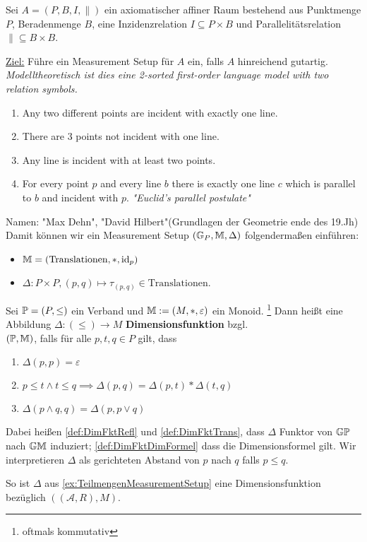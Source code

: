 \begin{beispiel}
    Sei $A = (P,B,I, \parallel)$ ein axiomatischer affiner Raum bestehend aus Punktmenge $P$, Beradenmenge $B$, eine
    Inzidenzrelation $I \subseteq P\times B$ und Parallelitätsrelation ${}\parallel{} \subseteq B \times B$.

    \underline{Ziel:} Führe ein Measurement Setup für $A$ ein, falls $A$ hinreichend gutartig.
    \textit{Modelltheoretisch ist dies eine 2-sorted first-order language model with two relation symbols.}

    \begin{enumerate}[label=(Axiom \arabic{*})]
        \item Any two different points are incident with exactly one line.
        \item There are 3 points not incident with one line.
        \item Any line is incident with at least two points.
        \item For every point $p$ and every line $b$ there is exactly one line $c$ which is parallel to $b$ and incident with $p$.
        \textit{"Euclid's parallel postulate"}
    \end{enumerate}

    Namen: "Max Dehn", "David Hilbert"(Grundlagen der Geometrie ende des 19.Jh)\nl
    Damit können wir ein Measurement Setup $(\G_P, \M, \Delta)$ folgendermaßen einführen:
    \begin{itemize}
        \item $\M = (\text{Translationen}, \ast, \id_p)$
        \item $\Delta: P\times P, (p,q) \mapsto \tau_{(p,q)} \in \text{Translationen}$.
    \end{itemize}
\end{beispiel}

\begin{definition}[Dimensionsfunktion]
    Sei $\P = (P, \leq)$ ein Verband und $\M := (M, *, \varepsilon)$ ein Monoid.%
    \footnote{oftmals kommutativ}
    Dann heißt eine Abbildung $\Delta\colon (\leq) \to M$ \textbf{Dimensionsfunktion} bzgl.\\$(\P, \M)$, falls für alle $p, t, q\in P$ gilt, dass
    \begin{enumerate}[label=(\arabic*)]
        \item $\Delta(p, p) = \varepsilon$
            \label{def:DimFktRefl}
        \item $p\leq t \land t\leq q \implies \Delta(p, q) = \Delta(p, t) * \Delta(t, q)$
            \label{def:DimFktTrans}
        \item $\Delta(p\land q, q) = \Delta(p, p\lor q)$
            \label{def:DimFktDimFormel}
    \end{enumerate}
    Dabei heißen \ref{def:DimFktRefl} und \ref{def:DimFktTrans}, dass $\Delta$ Funktor von $\G\P$ nach $\G\M$ induziert;
    \ref{def:DimFktDimFormel} dass die Dimensionsformel gilt.
    Wir interpretieren $\Delta$ als gerichteten Abstand von $p$ nach $q$ falls $p\leq q$.
\end{definition}
So ist $\Delta$ aus \autoref{ex:TeilmengenMeasurementSetup} eine Dimensionsfunktion bezüglich $((\mathcal{A}, R), M)$.

